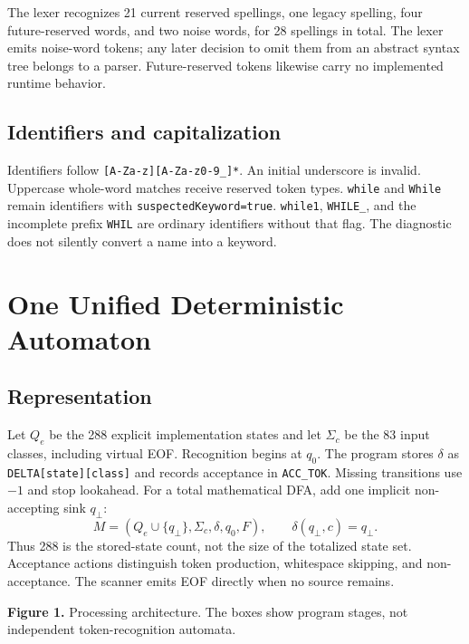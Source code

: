 \documentclass[11pt,a4paper]{article}
\newcommand{\code}[1]{\texttt{#1}}
\begin{document}
The lexer recognizes 21 current reserved spellings, one legacy spelling, four
future-reserved words, and two noise words, for 28 spellings in total. The lexer emits noise-word
tokens; any later decision to omit them from an abstract syntax tree belongs
to a parser. Future-reserved tokens likewise carry no implemented runtime behavior.

\subsection{Identifiers and capitalization}
Identifiers follow \code{[A-Za-z][A-Za-z0-9\_]*}. An initial underscore is
invalid. Uppercase whole-word matches receive reserved token types.
\code{while} and \code{While} remain identifiers with
\code{suspectedKeyword=true}. \code{while1}, \code{WHILE\_}, and the incomplete
prefix \code{WHIL} are ordinary identifiers without that flag. The diagnostic
does not silently convert a name into a keyword.

\clearpage
\section{One Unified Deterministic Automaton}
\subsection{Representation}
Let $Q_e$ be the 288 explicit implementation states and let $\Sigma_c$ be
the 83 input classes, including virtual EOF. Recognition begins at $q_0$.
The program stores $\delta$ as \code{DELTA[state][class]} and records acceptance
in \code{ACC\_TOK}. Missing transitions use $-1$ and stop lookahead.
For a total mathematical DFA, add one implicit non-accepting sink $q_\bot$:
\[
M=(Q_e\cup\{q_\bot\},\Sigma_c,\delta,q_0,F),
\qquad \delta(q_\bot,c)=q_\bot.
\]
Thus 288 is the stored-state count, not the size of the totalized state set.
Acceptance actions distinguish token production, whitespace skipping, and
non-acceptance. The scanner emits EOF directly when no source remains.

\begin{center}
\end{center}
{\small\textbf{Figure 1.} Processing architecture. The boxes show program stages,
not independent token-recognition automata.}
\end{document}
